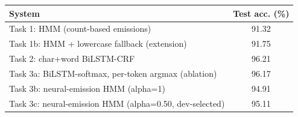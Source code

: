\begin{tabular}{lc}\hline System & Test acc. (\%) \\\hline
Task 1: HMM (count-based emissions) & 91.32 \\
Task 1b: HMM + lowercase fallback (extension) & 91.75 \\
Task 2: char+word BiLSTM-CRF & 96.21 \\
Task 3a: BiLSTM-softmax, per-token argmax (ablation) & 96.17 \\
Task 3b: neural-emission HMM (alpha=1) & 94.91 \\
Task 3c: neural-emission HMM (alpha=0.50, dev-selected) & 95.11 \\
\hline\end{tabular}
